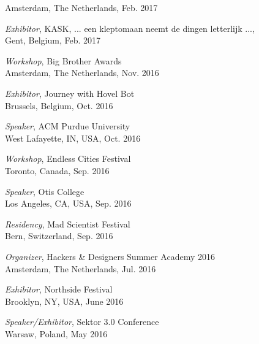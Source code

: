 \begin{itemize}[leftmargin=0.15in, label={}]
{{        {Amsterdam, The Netherlands, Feb. 2017} \\
    }}
    \small{\item{
        {\emph{Exhibitor}, KASK, ... een kleptomaan neemt de dingen letterlijk ...,} \\
        {Gent, Belgium, Feb. 2017} \\
    }}
    \small{\item{
        {\emph{Workshop}, Big Brother Awards} \\
        {Amsterdam, The Netherlands, Nov. 2016} \\
    }}
    \small{\item{
        {\emph{Exhibitor}, Journey with Hovel Bot} \\
        {Brussels, Belgium, Oct. 2016} \\
    }}
    \small{\item{
        {\emph{Speaker}, ACM Purdue University} \\
        {West Lafayette, IN, USA, Oct. 2016} \\
    }}
    \small{\item{
        {\emph{Workshop}, Endless Cities Festival} \\
        {Toronto, Canada, Sep. 2016} \\
    }}
    \small{\item{
        {\emph{Speaker}, Otis College} \\
        {Los Angeles, CA, USA, Sep. 2016} \\
    }}
    \small{\item{
        {\emph{Residency}, Mad Scientist Festival} \\
        {Bern, Switzerland, Sep. 2016} \\
    }}
    \small{\item{
        {\emph{Organizer}, Hackers \& Designers Summer Academy 2016} \\
        {Amsterdam, The Netherlands, Jul. 2016} \\
    }}
    \small{\item{
        {\emph{Exhibitor}, Northside Festival} \\
        {Brooklyn, NY, USA, June 2016} \\
    }}
    \small{\item{
        {\emph{Speaker/Exhibitor}, Sektor 3.0 Conference} \\
        {Warsaw, Poland, May 2016} \\
    }}
    \small{\item{
}}
\end{itemize}

